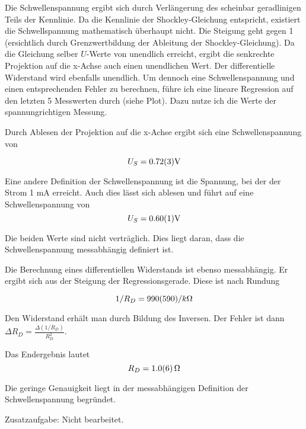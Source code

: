 \documentclass[a4paper,german,12pt,smallheadings]{scrartcl}
\begin{document}
Die Schwellenspannung ergibt sich durch Verlängerung des scheinbar geradlinigen
Teils der Kennlinie. Da die Kennlinie der Shockley-Gleichung entspricht,
existiert die Schwellspannung mathematisch überhaupt nicht. Die Steigung geht
gegen 1 (ersichtlich durch Grenzwertbildung der Ableitung der
Shockley-Gleichung). Da die Gleichung selber $U$-Werte von unendlich erreicht,
ergibt die senkrechte Projektion auf die x-Achse auch einen unendlichen Wert.
Der differentielle Widerstand wird ebenfalls unendlich. Um dennoch eine
Schwellenspannung und einen entsprechenden Fehler zu berechnen, führe ich eine
lineare Regression auf den letzten 5 Messwerten durch (siehe Plot). Dazu nutze
ich die Werte der spannungrichtigen Messung.

Durch Ablesen der Projektion auf die x-Achse ergibt sich eine Schwellenspannung
von

\begin{equation}
  U_S = \num{0.72+-0.03} \text{V}
\end{equation}

Eine andere Definition der Schwellenspannung ist die Spannung, bei der der
Strom 1 mA erreicht. Auch dies lässt sich ablesen und führt auf eine
Schwellenspannung von
\begin{equation}
  U_S = \num{0.60\pm0.01} \text{V}
\end{equation}

Die beiden Werte sind nicht verträglich. Dies liegt daran, dass die
Schwellenspannung messabhängig definiert ist.

Die Berechnung eines differentiellen Widerstands ist ebenso messabhängig. Er
ergibt sich aus der Steigung der Regressionsgerade. Diese ist nach Rundung

\begin{equation}
  1/R_D = \num{990\pm590} / k \Omega
\end{equation}

Den Widerstand erhält man durch Bildung des Inversen. Der Fehler ist dann
$\Delta R_D = \frac{\Delta(1/R_D)}{R_D^2}$.

Das Endergebnis lautet
\begin{equation}
  R_D = \num{1.0+-0.6} \,\Omega
\end{equation}

Die geringe Genauigkeit liegt in der messabhängigen Definition der
Schwellenspannung begründet.

Zusatzaufgabe: Nicht bearbeitet.
\end{document}
